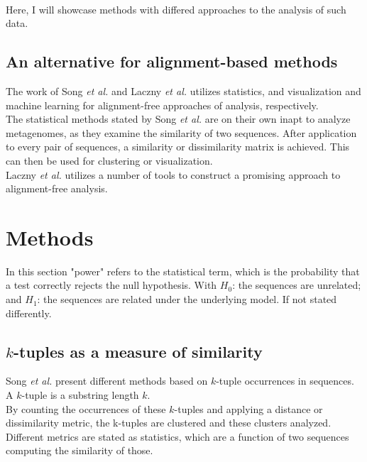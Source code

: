 \documentclass[twocolumn]{bmcart}%
\begin{document}
\paragraph*{}
Here, I will showcase methods with differed approaches to the analysis of such data. 
\subsection*{An alternative for alignment-based methods}
The work of Song \textit{et al.} \cite{doi:10.1093/bib/bbt067} and Laczny \textit{et al.} \cite{Laczny2014} utilizes statistics, and visualization and machine learning for alignment-free approaches of analysis, respectively.\\
The statistical methods stated by Song \textit{et al.} are on their own inapt to analyze metagenomes, as they examine the similarity of two sequences. After application to every pair of sequences, a similarity or dissimilarity matrix is achieved. This can then be used for clustering or visualization.\\
Laczny \textit{et al.} utilizes a number of tools to construct a promising approach to alignment-free analysis.
\section*{Methods}
In this section "power" refers to the statistical term, which is the probability that a test correctly rejects the null hypothesis. With $H_0$: the sequences are unrelated; and $H_1$: the sequences are related under the underlying model. If not stated differently.
\subsection*{$k$-tuples as a measure of similarity}
Song \textit{et al.}\cite{doi:10.1093/bib/bbt067} present different methods based on $k$-tuple occurrences in sequences. A $k$-tuple is a substring length $k$.\\
By counting the occurrences of these $k$-tuples and applying a distance or dissimilarity metric, the k-tuples are clustered and these clusters analyzed. Different metrics are stated as statistics, which are a function of two sequences computing the similarity of those.\\
\end{document}
